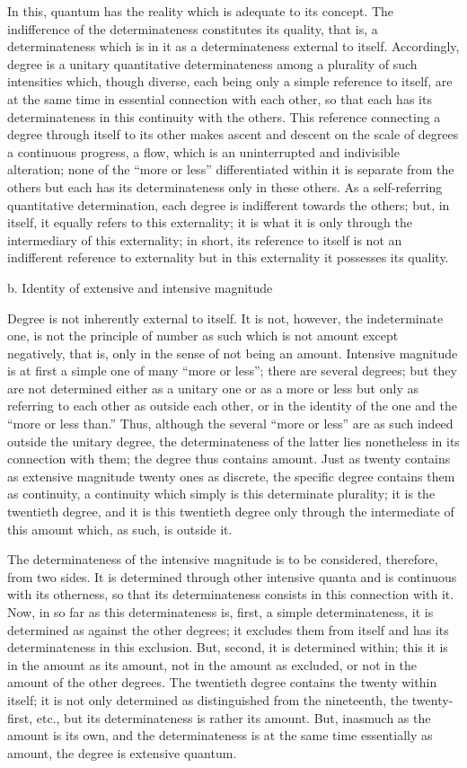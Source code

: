 In this, quantum has the reality which is adequate to its concept.
The indifference of the determinateness constitutes its quality,
that is, a determinateness which is in it
as a determinateness external to itself.
Accordingly, degree is a unitary quantitative determinateness
among a plurality of such intensities
which, though diverse, each being only a simple reference to itself,
are at the same time in essential connection with each other,
so that each has its determinateness in this continuity with the others.
This reference connecting a degree through itself to its other
makes ascent and descent on the scale of degrees
a continuous progress, a flow,
which is an uninterrupted and indivisible alteration;
none of the “more or less” differentiated within it
is separate from the others
but each has its determinateness only in these others.
As a self-referring quantitative determination,
each degree is indifferent towards the others;
but, in itself, it equally refers to this externality;
it is what it is only through
the intermediary of this externality;
in short, its reference to itself is not
an indifferent reference to externality
but in this externality it possesses its quality.

b. Identity of extensive and intensive magnitude

Degree is not inherently external to itself.
It is not, however, the indeterminate one,
is not the principle of number as such
which is not amount except negatively,
that is, only in the sense of not being an amount.
Intensive magnitude is at first a simple one
of many “more or less”;
there are several degrees;
but they are not determined either as a unitary one or as a more or
less but only as referring to each other as outside each other,
or in the identity of the one and the “more or less than.”
Thus, although the several “more
or less” are as such indeed outside the unitary degree,
the determinateness of the latter lies nonetheless
in its connection with them;
the degree thus contains amount.
Just as twenty contains as extensive magnitude
twenty ones as discrete,
the specific degree contains them as continuity,
a continuity which simply is this determinate plurality;
it is the twentieth degree,
and it is this twentieth degree
only through the intermediate of this amount
which, as such, is outside it.

The determinateness of the intensive magnitude is
to be considered, therefore, from two sides.
It is determined through other intensive quanta
and is continuous with its otherness,
so that its determinateness consists
in this connection with it.
Now, in so far as this determinateness is,
first, a simple determinateness,
it is determined as against the other degrees;
it excludes them from itself
and has its determinateness in this exclusion.
But, second, it is determined within;
this it is in the amount as its amount,
not in the amount as excluded,
or not in the amount of the other degrees.
The twentieth degree contains the twenty within itself;
it is not only determined as distinguished from the nineteenth,
the twenty-first, etc.,
but its determinateness is rather its amount.
But, inasmuch as the amount is its own,
and the determinateness is at the same time
essentially as amount, the degree is extensive quantum.

